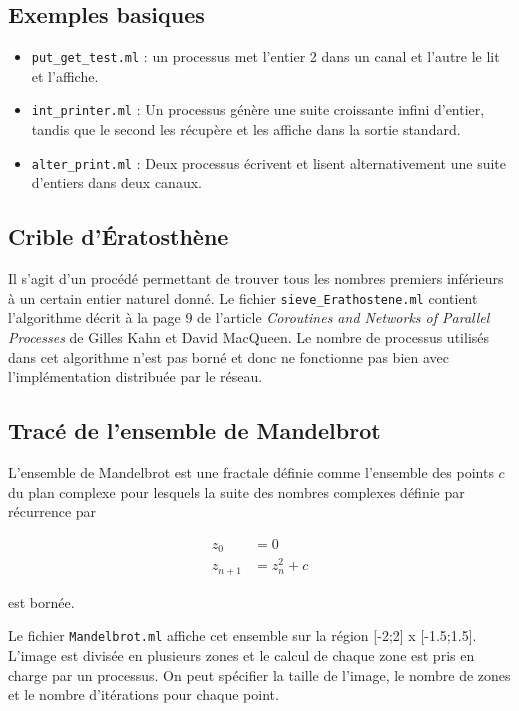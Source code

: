 \subsection{Exemples basiques}\label{exemples-basiques}

\begin{itemize}
\itemsep1pt\parskip0pt
\item
  \texttt{put\_get\_test.ml} : un processus met l'entier 2 dans un canal
  et l'autre le lit et l'affiche.
\item
  \texttt{int\_printer.ml} : Un processus génère une suite croissante
  infini d'entier, tandis que le second les récupère et les affiche dans
  la sortie standard.
\item
  \texttt{alter\_print.ml} : Deux processus écrivent et lisent
  alternativement une suite d'entiers dans deux canaux.
\end{itemize}

\subsection{Crible d'Ératosthène}\label{crible-duxe9ratosthuxe8ne}

Il s'agit d'un procédé permettant de trouver tous les nombres premiers
inférieurs à un certain entier naturel donné. Le fichier
\texttt{sieve\_Erathostene.ml} contient l'algorithme décrit à la page 9
de l'article \emph{Coroutines and Networks of Parallel Processes} de
Gilles Kahn et David MacQueen. Le nombre de processus utilisés dans cet
algorithme n'est pas borné et donc ne fonctionne pas bien avec
l'implémentation distribuée par le réseau.

\subsection{Tracé de l'ensemble de
Mandelbrot}\label{tracuxe9-de-lensemble-de-mandelbrot}

L'ensemble de Mandelbrot est une fractale définie comme l'ensemble des
points $c$ du plan complexe pour lesquels la suite des nombres complexes
définie par récurrence par

\begin{align*}
  z_0 &= 0\\
  z_{n+1} &= z_n^2 + c
\end{align*}

est bornée.

Le fichier \texttt{Mandelbrot.ml} affiche cet ensemble sur la région 
{[}-2;2{]} x {[}-1.5;1.5{]}. L'image est divisée en plusieurs zones et le 
calcul de chaque zone est pris en charge par un processus. On peut spécifier 
la taille de l'image, le nombre de zones et le nombre d'itérations pour
chaque point.

